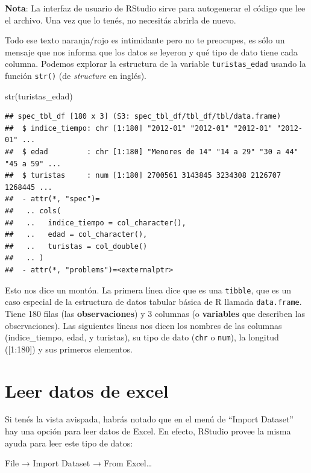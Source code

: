 \documentclass[
  openany]{book}
\newenvironment{Shaded}{\begin{snugshade}}{\end{snugshade}}
\newcommand{\FunctionTok}[1]{\textcolor[rgb]{0.00,0.00,0.00}{#1}}
\newcommand{\NormalTok}[1]{#1}
\begin{document}
\textbf{Nota}: La interfaz de usuario de RStudio sirve para autogenerar el código que lee el archivo.
Una vez que lo tenés, no necesitás abrirla de nuevo.

Todo ese texto naranja/rojo es intimidante pero no te preocupes, es sólo un mensaje que nos informa que los datos se leyeron y qué tipo de dato tiene cada columna.
Podemos explorar la estructura de la variable \texttt{turistas\_edad} usando la función \texttt{str()} (de \emph{structure} en inglés).

\begin{Shaded}
\begin{Highlighting}[]
\FunctionTok{str}\NormalTok{(turistas\_edad)}
\end{Highlighting}
\end{Shaded}

\begin{verbatim}
## spec_tbl_df [180 x 3] (S3: spec_tbl_df/tbl_df/tbl/data.frame)
##  $ indice_tiempo: chr [1:180] "2012-01" "2012-01" "2012-01" "2012-01" ...
##  $ edad         : chr [1:180] "Menores de 14" "14 a 29" "30 a 44" "45 a 59" ...
##  $ turistas     : num [1:180] 2700561 3143845 3234308 2126707 1268445 ...
##  - attr(*, "spec")=
##   .. cols(
##   ..   indice_tiempo = col_character(),
##   ..   edad = col_character(),
##   ..   turistas = col_double()
##   .. )
##  - attr(*, "problems")=<externalptr>
\end{verbatim}

Esto nos dice un montón.
La primera línea dice que es una \texttt{tibble}, que es un caso especial de la estructura de datos tabular básica de R llamada \texttt{data.frame}.
Tiene 180 filas (las \textbf{observaciones}) y 3 columnas (o \textbf{variables} que describen las observaciones).
Las siguientes líneas nos dicen los nombres de las columnas (indice\_tiempo, edad, y turistas), su tipo de dato (\texttt{chr} o \texttt{num}), la longitud ({[}1:180{]}) y sus primeros elementos.

\hypertarget{leer-datos-de-excel}{%
\section{Leer datos de excel}\label{leer-datos-de-excel}}

Si tenés la vista avispada, habrás notado que en el menú de ``Import Dataset'' hay una opción para leer datos de Excel.
En efecto, RStudio provee la misma ayuda para leer este tipo de datos:

File → Import Dataset → From Excel\ldots{}
\end{document}
